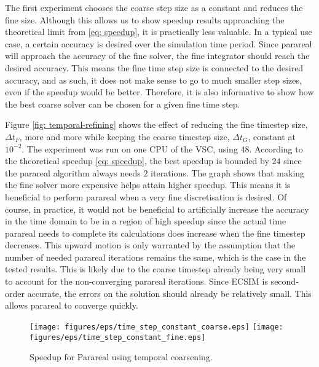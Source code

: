 The first experiment chooses the coarse step size as a constant and reduces the fine size. Although this allows us to show speedup results approaching the theoretical limit from \ref{eq: speedup}, it is practically less valuable. In a typical use case, a certain accuracy is desired over the simulation time period. Since parareal will approach the accuracy of the fine solver, the fine integrator should reach the desired accuracy. This means the fine time step size is connected to the desired accuracy, and as such, it does not make sense to go to much smaller step sizes, even if the speedup would be better.   Therefore, it is also informative to show how the best coarse solver can be chosen for a given fine time step.

Figure \ref{fig: temporal-refining} shows the effect of reducing the fine timestep size, $\Delta t_F$, more and more while keeping the coarse timestep size, $\Delta t_G$, constant at $10^{-2}$. The experiment was run on one CPU of the VSC, using 48. According to the theoretical speedup \ref{eq: speedup}, the best speedup is bounded by $24$ since the parareal algorithm always needs $2$ iterations. The graph shows that making the fine solver more expensive helps attain higher speedup. This means it is beneficial to perform parareal when a very fine discretisation is desired. Of course, in practice, it would not be beneficial to artificially increase the accuracy in the time domain to be in a region of high speedup since the actual time parareal needs to complete its calculations does increase when the fine timestep decreases. This upward motion is only warranted by the assumption that the number of needed parareal iterations remains the same, which is the case in the tested results. This is likely due to the coarse timestep already being very small to account for the non-converging parareal iterations. Since ECSIM is second-order accurate, the errors on the solution should already be relatively small. This allows parareal to converge quickly.
 \begin{figure}[h]
    \centering
    \texttt{[image: figures/eps/time\_step\_constant\_coarse.eps]}
    \texttt{[image: figures/eps/time\_step\_constant\_fine.eps]}
    \caption{Speedup for Parareal using temporal coarsening.}
    \label{fig: temporal-coarsening}
\end{figure}

